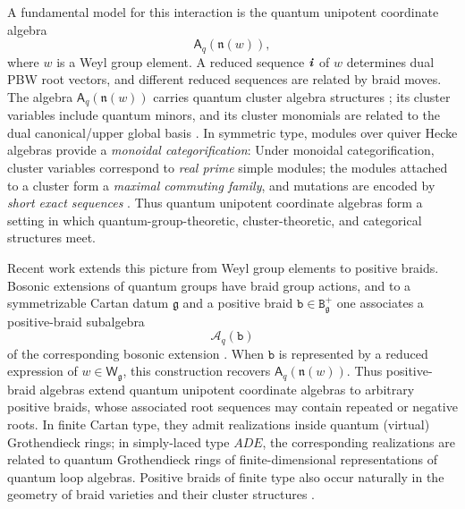 \documentclass[12pt, leqno]{amsart}
\numberwithin{equation}{section}
\theoremstyle{plain}
\theoremstyle{definition}
\newcommand{\g}{\mathfrak{g}}
\newcommand{\n}{\mathfrak{n}}
\newcommand{\ii}{ \textbf{\textit{i}}}
\newcommand{\sfA}{\mathsf{A}}
\newcommand{\sfW}{\mathsf{W}}
\newcommand{\scrA}{\mathscr{A}}
\newcommand{\ttB}{\mathtt{B}}
\newcommand{\ttb}{\mathtt{b}}
\begin{document}
\smallskip

A fundamental model for this interaction is the quantum unipotent
coordinate algebra
\[
\sfA_q(\n(w)),
\]
where $w$ is a Weyl group element. A reduced sequence $\ii$ of $w$
determines dual PBW root vectors, and different reduced
sequences are related by braid moves. The algebra
$\sfA_q(\n(w))$ carries quantum cluster algebra structures
\cite{GLS11,GLS13,GY17,GY21}; its cluster variables include quantum
minors, and its cluster monomials are related to the dual canonical/upper global 
basis \cite{Kimura12,KKKO18}. In symmetric type, modules over quiver
Hecke algebras provide a \emph{monoidal categorification}: Under monoidal categorification, cluster variables correspond to \emph{real
prime} simple modules; the modules attached to a cluster form a \emph{maximal
commuting family}, and mutations are encoded by \emph{short exact sequences}
\cite{KKKO18}. Thus quantum unipotent coordinate algebras form a
setting in which quantum-group-theoretic, cluster-theoretic, and
categorical structures meet.

\smallskip

Recent work extends this picture from Weyl group elements to positive
braids. Bosonic extensions of quantum groups have braid group
actions, and to a symmetrizable Cartan datum $\g$ and a positive braid
$\ttb\in\ttB_\g^+$ one associates a positive-braid subalgebra
\[
\scrA_q(\ttb)
\]
of the corresponding bosonic extension
\cite{HL16,FHOO,JLO2,OP24,KKOP24,KKOP24B,KKOP25M}. 
When $\ttb$ is represented by a reduced expression of
$w\in\sfW_\g$, this construction recovers $\sfA_q(\n(w))$. Thus
positive-braid algebras extend quantum unipotent coordinate algebras
to arbitrary positive braids, whose associated root
sequences may contain repeated or negative roots. In finite Cartan type, they admit
realizations inside quantum (virtual) Grothendieck rings; in simply-laced
type $ADE$, the corresponding realizations are related to quantum
Grothendieck rings of finite-dimensional representations of quantum
loop algebras. Positive braids of finite type also occur naturally in the geometry of
braid varieties and their cluster structures \cite{CGGLSS25}.

\smallskip
\end{document}

